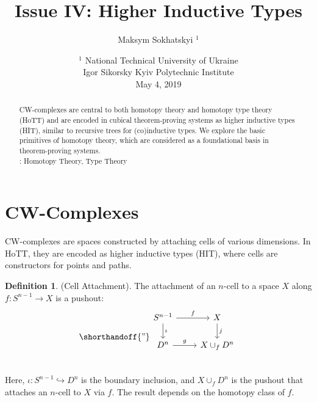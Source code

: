 \documentclass{article}
\theoremstyle{definition}
\newtheorem{definition}{Definition}
\newcommand*{\incmap}{\hookrightarrow}
\begin{document}
\title{Issue IV: Higher Inductive Types}
\author{Maksym Sokhatskyi $^1$}
\date{ $^1$ National Technical University of Ukraine \\
       \small Igor Sikorsky Kyiv Polytechnic Institute \\
       May 4, 2019 }
\maketitle

\begin{abstract}
CW-complexes are central to both homotopy theory and homotopy type theory (HoTT) and are encoded
in cubical theorem-proving systems as higher inductive types (HIT), similar to recursive
trees for (co)inductive types. We explore the basic primitives of homotopy theory,
which are considered as a foundational basis in theorem-proving systems. \\
: Homotopy Theory, Type Theory
\end{abstract}

\tableofcontents

\section{CW-Complexes}
CW-complexes are spaces constructed by attaching cells of various
dimensions. In HoTT, they are encoded as higher inductive types (HIT),
where cells are constructors for points and paths.

\begin{definition} (Cell Attachment).
The attachment of an $n$-cell to a space \( X \)
along \( f : S^{n-1} \to X \) is a pushout:
\[
\shorthandoff{"}
\begin{tikzcd}
S^{n-1} \arrow[r, "f"] \arrow[d, "\iota"] & X \arrow[d, "j"] \\
D^n \arrow[r, "g"]                        & X \cup_f D^n \\
\end{tikzcd}
\]
Here, \( \iota : S^{n-1} \incmap D^n \) is the boundary inclusion,
and \( X \cup_f D^n \) is the pushout that attaches an $n$-cell to \( X \) via \( f \). The result depends on
the homotopy class of \( f \).
\end{definition}
\end{document}
